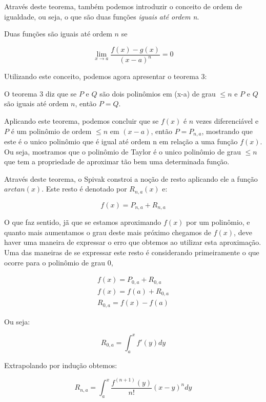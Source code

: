 \documentclass[a4paper, 12pt]{article}
\begin{document}
Através deste teorema, também podemos introduzir o conceito de ordem de igualdade,
ou seja, o que são duas funções \textit{iguais até ordem n}.

Duas funções são iguais até ordem $n$ se

\begin{equation}
	\nonumber \lim_{x \to a }\frac{f(x) - g(x)}{(x-a)^n} = 0
\end{equation}

Utilizando este conceito, podemos agora apresentar o teorema 3:

O teorema 3 diz que se $P$ e $Q$ são dois polinômios em (x-a) de grau $\leq n$ e $P$
e $Q$ são iguais até ordem $n$, então $P=Q$.

Aplicando este teorema, podemos concluir que se $f(x)$ é $n$ vezes
diferenciável e $P$ é um polinômio de ordem $\leq n$ em $(x-a)$, então $P = P_{n,a}$, mostrando
que este é o unico polinômio que é igual até ordem n em relação a uma função $f(x)$. Ou seja,
mostramos que o polinômio de Taylor é o unico
polinômio de grau $\leq n $ que tem a propriedade de aproximar tão bem uma determinada função.

Através deste teorema, o Spivak constroi a noção de resto aplicando ele a função
$arctan(x)$. Este resto é denotado por $R_{n,a}(x)$ e:

\begin{equation}
	\nonumber f(x) = P_{n,a} + R_{n,a}
\end{equation}

O que faz sentido, jã que se estamos aproximando $f(x)$ por um polinômio, e quanto mais aumentamos
o grau deste mais próximo chegamos de $f(x)$, deve haver uma maneira de expressar o erro
que obtemos ao utilizar esta aproximação. Uma das maneiras de se expressar este resto é considerando
primeiramente o que ocorre para o polinômio de grau $0$,

\begin{align*}
	f(x) = P_{0,a} + R_{0,a} \\
	f(x) = f(a) + R_{0,a}    \\
	R_{0,a} = f(x) - f(a)
\end{align*}

Ou seja:

\begin{equation}
	\nonumber R_{0,a} = \int_{a}^{x} f'(y)dy
\end{equation}

Extrapolando por indução obtemos:

\begin{equation}
	\nonumber R_{n,a} = \int_{a}^{x} \frac{f^{(n+1)}(y)}{n!}(x-y)^n dy
\end{equation}
\end{document}
